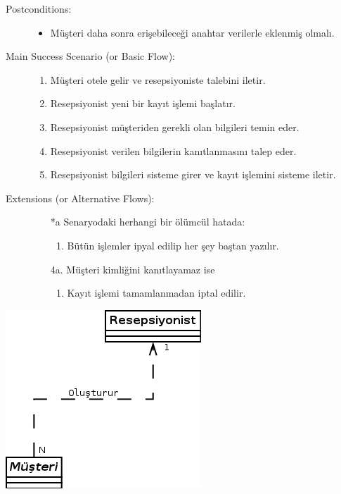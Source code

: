 \documentclass[12pt,a4paper]{report}
\begin{document}
\begin{description}
\item[Postconditions:] \hspace{10mm}
\begin{itemize}
\item Müşteri daha sonra erişebileceği anahtar verilerle eklenmiş olmalı.
\end{itemize}
\item[Main Success Scenario (or Basic Flow):] \hspace{10mm}
\begin{enumerate}
\item Müşteri otele gelir ve resepsiyoniste talebini iletir.
\item Resepsiyonist yeni bir kayıt işlemi başlatır.
\item Resepsiyonist müşteriden gerekli olan bilgileri temin eder.
\item Resepsiyonist verilen bilgilerin kanıtlanmasını talep eder.
\item Resepsiyonist bilgileri sisteme girer ve kayıt işlemini sisteme iletir.
\end{enumerate}
\item[Extensions (or Alternative Flows):] \hspace{10mm}
\begin{itemize}
\item[*a] Senaryodaki herhangi bir ölümcül hatada:
    \begin{enumerate}
    \item Bütün işlemler ipyal edilip her şey baştan yazılır.
    \end{enumerate}
\item[4a.] Müşteri kimliğini kanıtlayamaz ise
    \begin{enumerate} 
    \item Kayıt işlemi tamamlanmadan iptal edilir.
    \end{enumerate}
\end{itemize}

\end{description}
\begin{center}
\includegraphics{dia/usecase1.png}
\end{center}
\end{document}
